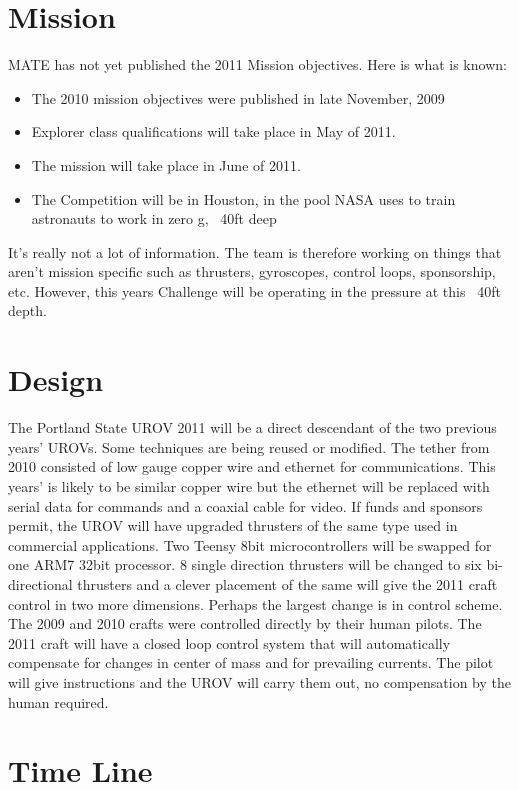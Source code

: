 \documentclass{proposalnsf}
\begin{document}
\section{Mission}

MATE has not yet published the 2011 Mission objectives. Here is what is known:
\begin{itemize}
\item The 2010 mission objectives were published in late November, 2009
\item Explorer class qualifications will take place in May of 2011.
\item The mission will take place in June of 2011.
\item The Competition will be in Houston, in the pool NASA uses to train astronauts to work in zero g, ~40ft deep
\end{itemize}
It's really not a lot of information. The team is therefore working on things that aren't mission specific such as thrusters, gyroscopes, control loops, sponsorship, etc.
However, this years Challenge will be operating in the pressure at this ~40ft depth.


\section{Design}

The Portland State UROV 2011 will be a direct descendant of the two previous years' UROVs. Some techniques are being reused or modified. The tether from 2010 consisted of low gauge copper
 wire and ethernet for communications. This years' is likely to be similar copper wire but the ethernet will be replaced with serial data for commands and a coaxial cable for video. If
 funds and sponsors permit, the UROV will have upgraded thrusters of the same type used in commercial applications. Two Teensy 8bit microcontrollers will be swapped for one ARM7 32bit processor.
8 single direction thrusters will be changed to six bi-directional thrusters and a clever placement of the same will give the 2011 craft control in two more dimensions. 
Perhaps the largest change is in control scheme. The 2009 and 2010 crafts were controlled directly by their human pilots. The 2011 craft will have a closed loop control system that will automatically compensate for changes in center of mass and for prevailing currents. The pilot will give instructions and the UROV will carry them out, no compensation by the human required. 


\section{Time Line}
\end{document}
